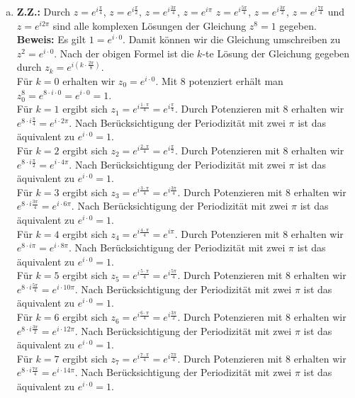 \documentclass{article}
\begin{document}
\begin{enumerate}[(a)]
	\item \textbf{Z.Z.:} Durch $z = e^{i\frac{\pi}{4}}$, $z = e^{i\frac{\pi}{2}}$, $z = e^{i\frac{3\pi}{4}}$, $z = e^{i\pi}$ $z = e^{i\frac{5\pi}{4}}$, $z = e^{i\frac{3\pi}{2}}$, $z = e^{i\frac{7\pi}{4}}$ und $z = e^{i2\pi}$ sind alle komplexen Lösungen der Gleichung $z^8 = 1$ gegeben.
	\textbf{Beweis:} Es gilt $1 = e^{i \cdot 0}$. Damit können wir die Gleichung umschreiben zu $z^2 = e^{i\cdot 0}$. Nach der obigen Formel ist die $k$-te Lösung der Gleichung gegeben durch $z_k = e^{i\left(k \cdot \frac{2\pi}{8}\right)}$.\\
	Für $k=0$ erhalten wir $z_0 = e^{i\cdot 0}$. Mit 8 potenziert erhält man $z_0^8 = e^{8\cdot i\cdot 0} = e^{i\cdot 0} = 1$.\\
	Für $k=1$ ergibt sich $z_1 = e^{i\frac{1\cdot \pi}{4}} = e^{i\frac{\pi}{4}}$. Durch Potenzieren mit 8 erhalten wir $e^{8\cdot i\frac{\pi}{4}} = e^{i\cdot 2\pi}$. Nach Berücksichtigung der Periodizität mit zwei $\pi$ ist das äquivalent zu $e^{i\cdot 0} = 1$.\\
	Für $k=2$ ergibt sich $z_2 = e^{i\frac{2\cdot \pi}{4}} = e^{i\frac{\pi}{2}}$. Durch Potenzieren mit 8 erhalten wir $e^{8\cdot i\frac{\pi}{2}} = e^{i\cdot 4\pi}$. Nach Berücksichtigung der Periodizität mit zwei $\pi$ ist das äquivalent zu $e^{i\cdot 0} = 1$.\\
	Für $k=3$ ergibt sich $z_3 = e^{i\frac{3\cdot \pi}{4}} = e^{i\frac{3\pi}{4}}$. Durch Potenzieren mit 8 erhalten wir $e^{8\cdot i\frac{3\pi}{4}} = e^{i\cdot 6\pi}$. Nach Berücksichtigung der Periodizität mit zwei $\pi$ ist das äquivalent zu $e^{i\cdot 0} = 1$.\\
	Für $k=4$ ergibt sich $z_4 = e^{i\frac{4\cdot \pi}{4}} = e^{i\pi}$. Durch Potenzieren mit 8 erhalten wir $e^{8\cdot i\pi} = e^{i\cdot 8\pi}$. Nach Berücksichtigung der Periodizität mit zwei $\pi$ ist das äquivalent zu $e^{i\cdot 0} = 1$.\\
	Für $k=5$ ergibt sich $z_5 = e^{i\frac{5\cdot \pi}{4}} = e^{i\frac{5\pi}{4}}$. Durch Potenzieren mit 8 erhalten wir $e^{8\cdot i\frac{5\pi}{4}} = e^{i\cdot 10\pi}$. Nach Berücksichtigung der Periodizität mit zwei $\pi$ ist das äquivalent zu $e^{i\cdot 0} = 1$.\\
	Für $k=6$ ergibt sich $z_6 = e^{i\frac{6\cdot \pi}{4}} = e^{i\frac{3\pi}{2}}$. Durch Potenzieren mit 8 erhalten wir $e^{8\cdot i\frac{3\pi}{2}} = e^{i\cdot 12\pi}$. Nach Berücksichtigung der Periodizität mit zwei $\pi$ ist das äquivalent zu $e^{i\cdot 0} = 1$.\\
	Für $k=7$ ergibt sich $z_7 = e^{i\frac{7\cdot \pi}{4}} = e^{i\frac{7\pi}{4}}$. Durch Potenzieren mit 8 erhalten wir $e^{8\cdot i\frac{7\pi}{4}} = e^{i\cdot 14\pi}$. Nach Berücksichtigung der Periodizität mit zwei $\pi$ ist das äquivalent zu $e^{i\cdot 0} = 1$.

\end{enumerate}
\end{document}
